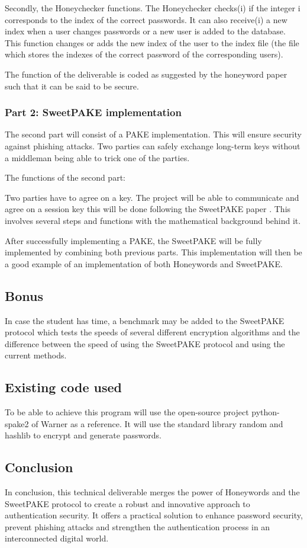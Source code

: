 \documentclass[conference,compsoc]{IEEEtran}
\begin{document}
Secondly, the Honeychecker functions. The Honeychecker checks(i) if the integer
i corresponds to the index of the correct passwords. It can also receive(i) a
new index when a user changes passwords or a new user is added to the database.
This function changes or adds the new index of the user to the index file (the
file which stores the indexes of the correct password of the corresponding
users).

The function of the deliverable is coded as suggested by the honeyword paper
such that it can be said to be secure.

\subsubsection{Part 2: SweetPAKE implementation} The second part will consist
of a PAKE implementation. This will ensure security against phishing attacks.
Two parties can safely exchange long-term keys without a middleman being able
to trick one of the parties.

The functions of the second part:

Two parties have to agree on a key. The project will be able to communicate and
agree on a session key this will be done following the SweetPAKE paper
\cite{sweetpake}. This involves several steps and functions with the
mathematical background behind it.

After successfully implementing a PAKE, the SweetPAKE will be fully implemented
by combining both previous parts. This implementation will then be a good
example of an implementation of both Honeywords and SweetPAKE.

\subsection{Bonus} In case the student has time, a benchmark may be added to the
SweetPAKE protocol which tests the speeds of several different encryption
algorithms and the difference between the speed of using the SweetPAKE protocol
and using the current methods.

\subsection{Existing code used} To be able to achieve this program will use the
open-source project python-spake2 of Warner as a reference. It will use the
standard library random and hashlib to encrypt and generate passwords.

\subsection{Conclusion} In conclusion, this technical deliverable merges the
power of Honeywords and the SweetPAKE protocol to create a robust and
innovative approach to authentication security. It offers a practical solution
to enhance password security, prevent phishing attacks and strengthen the
authentication process in an interconnected digital world.

\printbibliography

\clearpage
\end{document}
